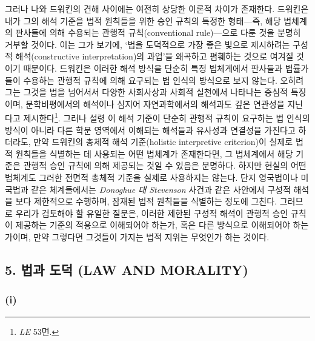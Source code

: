그러나 나와 드워킨의 견해 사이에는 여전히 상당한 이론적 차이가 존재한다.
드워킨은 내가 그의 해석 기준을 법적 원칙들을 위한 승인 규칙의 특정한
형태---즉, 해당 법체계의 판사들에 의해 수용되는 관행적 규칙(conventional
rule)---으로 다룬 것을 분명히 거부할 것이다. 이는 그가 보기에, `법을
도덕적으로 가장 좋은 빛으로 제시하려는 구성적 해석(constructive
interpretation)의 과업'을 왜곡하고 폄훼하는 것으로 여겨질 것이기
때문이다. 드워킨은 이러한 해석 방식을 단순히 특정 법체계에서 판사들과
법률가들이 수용하는 관행적 규칙에 의해 요구되는 법 인식의 방식으로 보지
않는다. 오히려 그는 그것을 법을 넘어서서 다양한 사회사상과 사회적
실천에서 나타나는 중심적 특징이며, 문학비평에서의 해석이나 심지어
자연과학에서의 해석과도 깊은 연관성을 지닌다고 제시한다\footnote{\emph{LE}
  53면.}. 그러나 설령 이 해석 기준이 단순히 관행적 규칙이 요구하는 법
인식의 방식이 아니라 다른 학문 영역에서 이해되는 해석들과 유사성과
연결성을 가진다고 하더라도, 만약 드워킨의 총체적 해석 기준(holistic
interpretive criterion)이 실제로 법적 원칙들을 식별하는 데 사용되는 어떤
법체계가 존재한다면, 그 법체계에서 해당 기준은 관행적 승인 규칙에 의해
제공되는 것일 수 있음은 분명하다. 하지만 현실의 어떤 법체계도 그러한
전면적 총체적 기준을 실제로 사용하지는 않는다. 단지 영국법이나 미국법과
같은 체계들에서는 \emph{Donoghue 대 Stevenson} 사건과 같은 사안에서
구성적 해석을 보다 제한적으로 수행하며, 잠재된 법적 원칙들을 식별하는
정도에 그친다. 그러므로 우리가 검토해야 할 유일한 질문은, 이러한 제한된
구성적 해석이 관행적 승인 규칙이 제공하는 기준의 적용으로 이해되어야
하는가, 혹은 다른 방식으로 이해되어야 하는가이며, 만약 그렇다면 그것들이
가지는 법적 지위는 무엇인가 하는 것이다.

\subsection{5. 법과 도덕 (LAW AND
MORALITY)}\label{uxbc95uxacfc-uxb3c4uxb355-law-and-morality}

\subsubsection{\texorpdfstring{(i) }{(i) 권리와 의무 (Rights and Duties)}}\label{i-uxad8cuxb9acuxc640-uxc758uxbb34-rights-and-duties}

